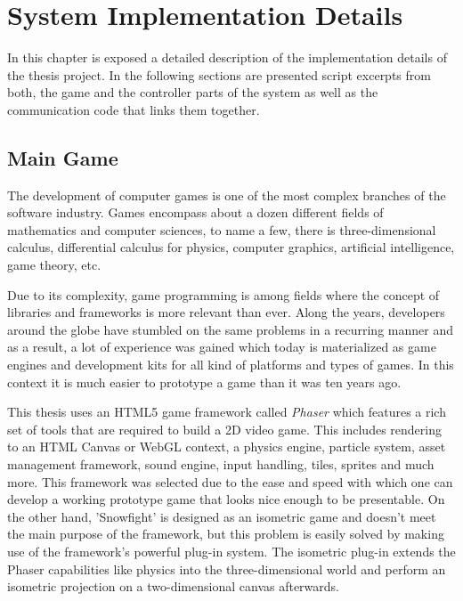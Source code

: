 \section{System Implementation Details}

In this chapter is exposed a detailed description of the implementation details
of the thesis project. In the following sections are presented script excerpts
from both, the game and the controller parts of the system as well as the
communication code that links them together.

\subsection{Main Game}

The development of computer games is one of the most complex branches of the
software industry. Games encompass about a dozen different fields of mathematics
and computer sciences, to name a few, there is three-dimensional calculus,
differential calculus for physics, computer graphics, artificial intelligence,
game theory, etc.

Due to its complexity, game programming is among fields where the concept of
libraries and frameworks is more relevant than ever. Along the years, developers
around the globe have stumbled on the same problems in a recurring manner and as
a result, a lot of experience was gained which today is materialized as game
engines and development kits for all kind of platforms and types of games. In
this context it is much easier to prototype a game than it was ten years ago.

This thesis uses an HTML5 game framework called \emph{Phaser} which features a
rich set of tools that are required to build a 2D video game. This includes
rendering to an HTML Canvas or WebGL context, a physics engine, particle system,
asset management framework, sound engine, input handling, tiles, sprites and
much more. This framework was selected due to the ease and speed with which one
can develop a working prototype game that looks nice enough to be presentable.
On the other hand, 'Snowfight' is designed as an isometric game and doesn't meet
the main purpose of the framework, but this problem is easily solved by making
use of the framework's powerful plug-in system. The isometric plug-in extends
the Phaser capabilities like physics into the three-dimensional world and
perform an isometric projection on a two-dimensional canvas afterwards.



